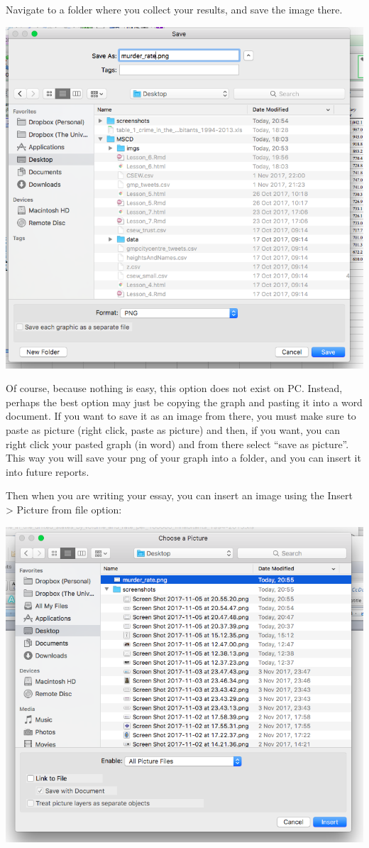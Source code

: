\documentclass[
]{book}
\begin{document}
Navigate to a folder where you collect your results, and save the image there.

\includegraphics{imgs/save_pic_2.png}

Of course, because nothing is easy, this option does not exist on PC. Instead, perhaps the best option may just be copying the graph and pasting it into a word document. If you want to save it as an image from there, you must make sure to paste as picture (right click, paste as picture) and then, if you want, you can right click your pasted graph (in word) and from there select ``save as picture''. This way you will save your png of your graph into a folder, and you can insert it into future reports.

Then when you are writing your essay, you can insert an image using the Insert \textgreater{} Picture from file option:

\includegraphics{imgs/find_pic.png}
\end{document}
